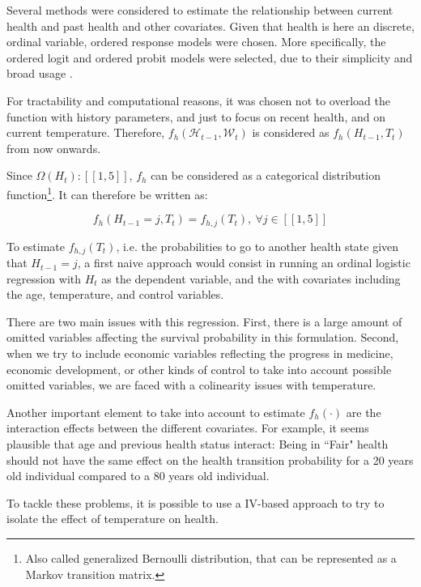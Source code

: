 \documentclass{article}
\begin{document}
Several methods were considered to estimate the relationship between current health and past health and other covariates. 
Given that health is here an discrete, ordinal variable, ordered response models were chosen.
More specifically, the ordered logit and ordered probit models were selected, due to their simplicity and broad usage \parencite{Wooldridge_2010}.

For tractability and computational reasons, 
it was chosen not to overload the function with 
history parameters, and just to focus on recent health, 
and on current temperature.
Therefore, 
$f_{h}(\mathcal{H}_{t-1},\mathcal{W}_{t})$ 
is considered as $f_{h}(H_{t-1},{T}_{t})$ from now onwards.

Since $\Omega(H_{t}) : [\![1,5]\!]$, $f_{h}$ can be
considered as a categorical distribution
function\footnote{Also called generalized Bernoulli distribution, that can be represented as a Markov transition matrix.}.
It can therefore be written as: 

\begin{equation}
    f_{h}(H_{t-1} = j,{T}_{t}) = 
    f_{h,j}(T_{t}), \ \forall j\in [\![1,5]\!]
\end{equation}

To estimate $f_{h,j}(T_{t})$,
i.e. the probabilities to go to another health state
given that $H_{t-1} = j$, 
a first naive approach would consist 
in running an ordinal logistic 
regression with $H_{t}$ as the dependent 
variable, and the with covariates including 
the age, temperature, and control variables.

There are two main issues with this regression. 
First, there is a large amount of omitted variables
affecting the survival probability in this formulation.
Second, when we try to include economic variables reflecting 
the progress in medicine, economic development, or 
other kinds of control to take into account possible
omitted variables, 
we are faced with a colinearity issues
with temperature. 

Another important element to take into account to estimate 
$f_{h}(\cdot)$ are the interaction 
effects between the different covariates.
For example, it seems plausible that age and previous health status interact:
Being in ``Fair"
health should not have the same effect on the health transition probability 
for a 20 years old individual compared to a 80 years old individual. 

To tackle these problems, it is possible to use a 
IV-based approach to try to isolate the effect of
temperature on health. 
\end{document}
